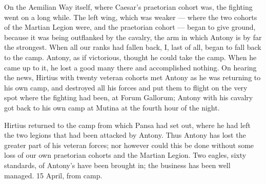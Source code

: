  On the Aemilian Way itself, where Caesar's praetorian cohort was, the fighting went on a long while. The left wing, which was weaker --- where the two cohorts of the Martian Legion were, and the praetorian cohort --- began to give ground, because it was being outflanked by the cavalry, the arm in which Antony is by far the strongest. When all our ranks had fallen back, I, last of all, began to fall back to the camp. Antony, as if victorious, thought he could take the camp. When he came up to it, he lost a good many there and accomplished nothing. On hearing the news, Hirtius with twenty veteran cohorts met Antony as he was returning to his own camp, and destroyed all his forces and put them to flight on the very spot where the fighting had been, at Forum Gallorum; Antony with his cavalry got back to his own camp at Mutina at the fourth hour of the night.

 Hirtius returned to the camp from which Pansa had set out, where he had left the two legions that had been attacked by Antony. Thus Antony has lost the greater part of his veteran forces; nor however could this be done without some loss of our own praetorian cohorts and the Martian Legion. Two eagles, sixty standards, of Antony's have been brought in; the business has been well managed. 15 April, from camp.

